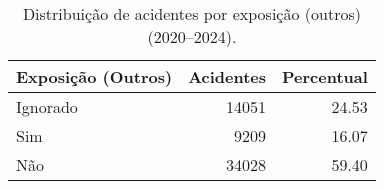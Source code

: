 \begin{table}
\caption{Distribuição de acidentes por exposição (outros) (2020–2024).}
\begin{tabular}{lrr}
\toprule
Exposição (Outros) & Acidentes & Percentual \\
\midrule
Ignorado & 14051 & 24.53 \\
Sim & 9209 & 16.07 \\
Não & 34028 & 59.40 \\
\bottomrule
\end{tabular}
\end{table}
